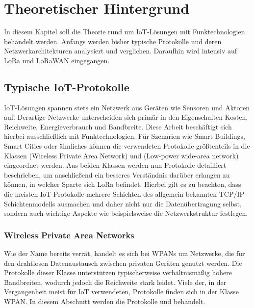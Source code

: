 \chapter{Theoretischer Hintergrund}
\label{sec:ThHi:first}

In diesem Kapitel soll die Theorie rund um IoT-Lösungen mit Funktechnologien behandelt werden. Anfangs werden bisher typische Protokolle und deren Netzwerkarchitekturen analysiert und verglichen. Daraufhin wird intensiv auf LoRa und LoRaWAN eingegangen. 

\section{Typische IoT-Protokolle}
\label{sec:ThHi:typical}

IoT-Lösungen spannen stets ein Netzwerk aus Geräten wie Sensoren und Aktoren auf. Derartige Netzwerke unterscheiden sich primär in den Eigenschaften Kosten, Reichweite, Energieverbrauch und Bandbreite. Diese Arbeit beschäftigt sich hierbei ausschließlich mit Funktechnologien. Für Szenarien wie Smart Buildings, Smart Cities oder ähnliches können die verwendeten Protokolle größtenteils in die Klassen  (Wireless Private Area Network) und  (Low-power wide-area network) eingeordnet werden. Aus beiden Klassen werden nun Protokolle detailliert beschrieben, um anschließend ein besseres Verständnis darüber erlangen zu können, in welcher Sparte sich LoRa befindet. Hierbei gilt es zu beachten, dass die meisten IoT-Protokolle mehrere Schichten des allgemein bekannten TCP/IP-Schichtenmodells ausmachen und daher nicht nur die Datenübertragung selbst, sondern auch wichtige Aspekte wie beispielsweise die Netzwerkstruktur festlegen.

\subsection{Wireless Private Area Networks}
\label{sec:ThHi:pan}

Wie der Name bereits verrät, handelt es sich bei WPANs um Netzwerke, die für den drahtlosen Datenaustausch zwischen privaten Geräten genutzt werden. Die Protokolle dieser Klasse unterstützen typischerweise verhältnismäßig höhere Bandbreiten, wodurch jedoch die Reichweite stark leidet. Viele der, in der Vergangenheit meist für IoT verwendeten, Protokolle finden sich in der Klasse WPAN. In diesem Abschnitt werden die Protokolle  und  behandelt.

